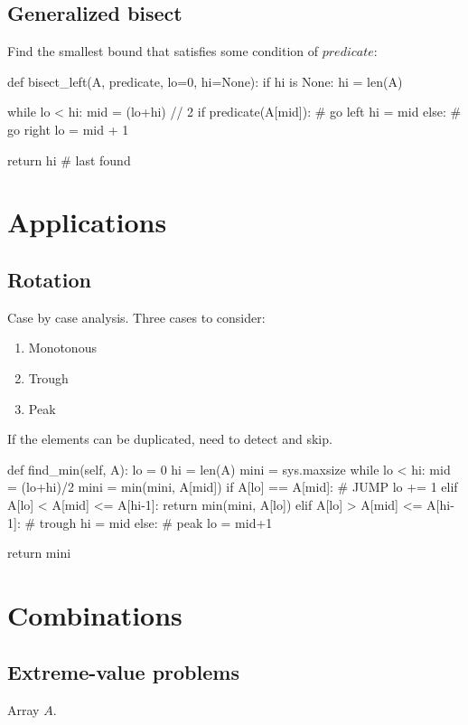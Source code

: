 \subsection{Generalized bisect}
Find the smallest bound that satisfies some condition of $predicate$:
\begin{python}
def bisect_left(A, predicate, lo=0, hi=None):
    if hi is None: hi = len(A)

    while lo < hi:
        mid = (lo+hi) // 2
        if predicate(A[mid]):  # go left
            hi = mid
        else:  # go right
            lo = mid + 1

    return hi  # last found
\end{python}
\section{Applications}
\subsection{Rotation}
 Case by case analysis. Three cases to consider:
\begin{enumerate}
\item Monotonous 
\item Trough 
\item Peak
\end{enumerate}

If the elements can be duplicated, need to detect and skip. 
\begin{python}
def find_min(self, A):
    lo = 0
    hi = len(A)
    mini = sys.maxsize
    while lo < hi:
        mid = (lo+hi)/2
        mini = min(mini, A[mid])
        if A[lo] == A[mid]:  # JUMP
            lo += 1
        elif A[lo] < A[mid] <= A[hi-1]:
            return min(mini, A[lo])
        elif A[lo] > A[mid] <= A[hi-1]:  # trough
            hi = mid
        else:  # peak
            lo = mid+1

    return mini
\end{python}
\section{Combinations}
\subsection{Extreme-value problems}\label{extremeValueProblem}
 Array $A$.

